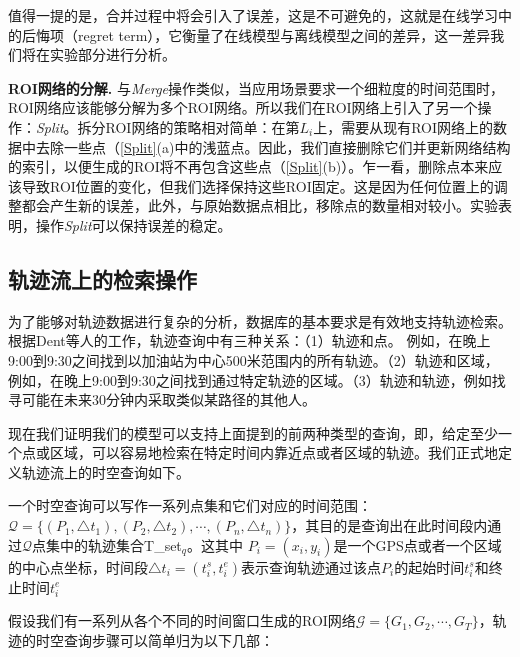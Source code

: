 值得一提的是，合并过程中将会引入了误差，这是不可避免的，这就是在线学习中的后悔项（regret term），它衡量了在线模型与离线模型之间的差异，这一差异我们将在实验部分进行分析。



\vspace{3mm}
\noindent\textbf{ROI网络的分解.} 
与\emph{Merge}操作类似，当应用场景要求一个细粒度的时间范围时，ROI网络应该能够分解为多个ROI网络。所以我们在ROI网络上引入了另一个操作：\emph{Split}。拆分ROI网络的策略相对简单：在第$L_i$上，需要从现有ROI网络上的数据中去除一些点（\ref{Split}(a)中的浅蓝点。因此，我们直接删除它们并更新网络结构的索引，以便生成的ROI将不再包含这些点（\ref{Split}(b)）。乍一看，删除点本来应该导致ROI位置的变化，但我们选择保持这些ROI固定。这是因为任何位置上的调整都会产生新的误差，此外，与原始数据点相比，移除点的数量相对较小。实验表明，操作\emph{Split}可以保持误差的稳定。

\subsection{轨迹流上的检索操作}
为了能够对轨迹数据进行复杂的分析，数据库的基本要求是有效地支持轨迹检索。根据Dent等人\cite {deng2011trajectory}的工作，轨迹查询中有三种关系：（1）轨迹和点。 例如，在晚上9:00到9:30之间找到以加油站为中心500米范围内的所有轨迹。（2）轨迹和区域，例如，在晚上9:00到9:30之间找到通过特定轨迹的区域。（3）轨迹和轨迹，例如找寻可能在未来30分钟内采取类似某路径的其他人。

现在我们证明我们的模型可以支持上面提到的前两种类型的查询，即，给定至少一个点或区域，可以容易地检索在特定时间内靠近点或者区域的轨迹。我们正式地定义轨迹流上的时空查询如下。


\begin{dingyi}[轨迹的时空查询]
一个时空查询可以写作一系列点集和它们对应的时间范围：$\mathcal{Q} = \{(P_1, \triangle t_1), (P_2, \triangle t_2), \cdots, (P_n, \triangle t_n)\}$，其目的是查询出在此时间段内通过$\mathcal{Q}$点集中的轨迹集合\gls{T_set}$_q$。这其中 $P_i = (x_i, y_i)$是一个GPS点或者一个区域的中心点坐标，时间段$\triangle t_i = (t^s_i, t^e_i)$表示查询轨迹通过该点$P_i$的起始时间$t^s_i$和终止时间$t^e_i$
\end{dingyi}

假设我们有一系列从各个不同的时间窗口生成的ROI网络$\mathcal{G} = \{G_1, G_2, \cdots, G_T\}$，轨迹的时空查询步骤可以简单归为以下几部：

